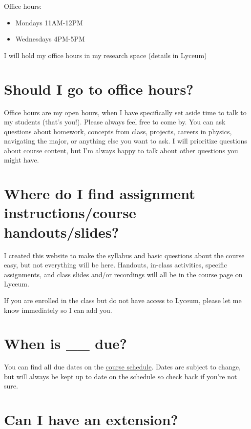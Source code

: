 \documentclass[
  letterpaper,
  DIV=11,
  numbers=noendperiod]{scrartcl}
\providecommand{\tightlist}{%
  \setlength{\itemsep}{0pt}\setlength{\parskip}{0pt}}\usepackage{longtable,booktabs,array}
\begin{document}
Office hours:

\begin{itemize}
\tightlist
\item
  Mondays 11AM-12PM
\item
  Wednesdays 4PM-5PM
\end{itemize}

I will hold my office hours in my research space (details in Lyceum)

\section{Should I go to office hours?}\label{goingtoofficehours}

Office hours are my open hours, when I have specifically set aside time
to talk to my students (that's you!). Please always feel free to come
by. You can ask questions about homework, concepts from class, projects,
careers in physics, navigating the major, or anything else you want to
ask. I will prioritize questions about course content, but I'm always
happy to talk about other questions you might have.

\section{Where do I find assignment instructions/course
handouts/slides?}\label{findstuff}

I created this website to make the syllabus and basic questions about
the course easy, but not everything will be here. Handouts, in-class
activities, specific assignments, and class slides and/or recordings
will all be in the course page on Lyceum.

If you are enrolled in the class but do not have access to Lyceum,
please let me know immediately so I can add you.

\section{When is \_\_ due?}\label{duedates}

You can find all due dates on the
\href{https://docs.google.com/spreadsheets/d/12bIFUWPCjQ1M-Uhela3GO7mmHF07_UZhAoRJAUmq4t4/edit?usp=sharing}{course
schedule}. Dates are subject to change, but will always be kept up to
date on the schedule so check back if you're not sure.

\section{Can I have an extension?}\label{extensionpolicy}
\end{document}
